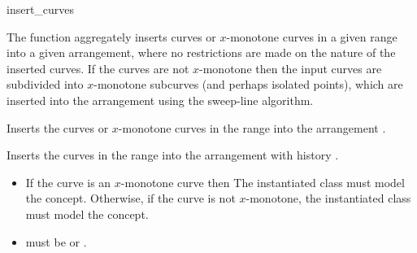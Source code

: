 \ccRefPageBegin

\begin{ccRefFunction}{insert_curves}

\ccDefinition

The function \ccRefName{} aggregately inserts curves or $x$-monotone
curves in a given range into a given arrangement, where no
restrictions are made on the nature of the inserted curves.  If the
curves are not $x$-monotone then the input curves are subdivided into
$x$-monotone subcurves (and perhaps isolated points), which are
inserted into the arrangement using the sweep-line algorithm.



Inserts the curves or $x$-monotone curves in the range
\ccc{[first,last)} into the arrangement .




Inserts the curves in the range \ccc{[first,last)} into the
arrangement with history .

\ccRequirements
\begin{itemize}
\item If the curve is an $x$-monotone curve then The instantiated
   class must model the 
  concept. Otherwise, if the curve is not $x$-monotone, the
  instantiated  class must model the
   concept. 
\item {} must be  or
  .
\end{itemize}

\end{ccRefFunction}

\ccRefPageEnd

